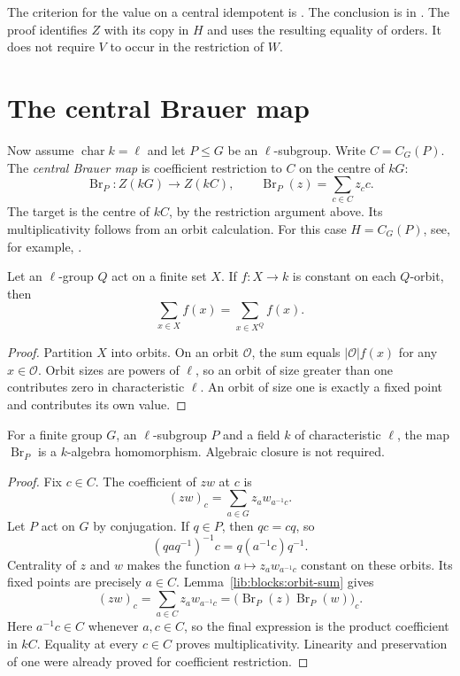 \begin{implementation}
The criterion for the value on a central idempotent is
.
The conclusion is
in .
The proof identifies $Z$ with its copy in $H$ and uses the resulting
equality of orders. It does not require $V$ to occur in the restriction
of $W$.
\end{implementation}

\section{The central Brauer map}
\label{lib:blocks:brauer-map}

Now assume $\operatorname{char}k=\ell$ and let $P\leq G$ be an
$\ell$-subgroup. Write $C=C_G(P)$. The \emph{central Brauer map}
is coefficient restriction to $C$ on the centre of $kG$:
\[
 \operatorname{Br}_P:Z(kG)\longrightarrow Z(kC),
 \qquad \operatorname{Br}_P(z)=\sum_{c\in C}z_cc.
\]
The target is the centre of $kC$, by the restriction argument above.
Its multiplicativity follows from an orbit calculation. For this case
$H=C_G(P)$, see, for example, \cite[Theorem~4.9]{Navarro1998}.

\begin{lemma}
\label{lib:blocks:orbit-sum}
Let an $\ell$-group $Q$ act on a finite set $X$. If $f:X\to k$ is
constant on each $Q$-orbit, then
\[
 \sum_{x\in X}f(x)=\sum_{x\in X^Q}f(x).
\]
\end{lemma}
\begin{proof}
Partition $X$ into orbits. On an orbit $\mathcal O$, the sum equals
$|\mathcal O|f(x)$ for any $x\in\mathcal O$. Orbit sizes are powers
of $\ell$, so an orbit of size greater than one contributes zero in
characteristic $\ell$. An orbit of size one is exactly a fixed point
and contributes its own value.
\end{proof}

\begin{theorem}
\label{lib:blocks:brauer-multiplicative}
For a finite group $G$, an $\ell$-subgroup $P$ and a field $k$ of
characteristic $\ell$, the map $\operatorname{Br}_P$ is a
$k$-algebra homomorphism. Algebraic closure is not required.
\end{theorem}
\begin{proof}
Fix $c\in C$. The coefficient of $zw$ at $c$ is
\[
 (zw)_c=\sum_{a\in G}z_a w_{a^{-1}c}.
\]
Let $P$ act on $G$ by conjugation. If $q\in P$, then $qc=cq$, so
\[
 (qaq^{-1})^{-1}c=q(a^{-1}c)q^{-1}.
\]
Centrality of $z$ and $w$ makes the function
$a\mapsto z_aw_{a^{-1}c}$ constant on these orbits. Its fixed points
are precisely $a\in C$. Lemma~\ref{lib:blocks:orbit-sum} gives
\[
 (zw)_c=\sum_{a\in C}z_aw_{a^{-1}c}
       =\bigl(\operatorname{Br}_P(z)\operatorname{Br}_P(w)\bigr)_c.
\]
Here $a^{-1}c\in C$ whenever $a,c\in C$, so the final expression is
the product coefficient in $kC$. Equality at every $c\in C$ proves
multiplicativity. Linearity and preservation of one were already proved
for coefficient restriction.
\end{proof}

